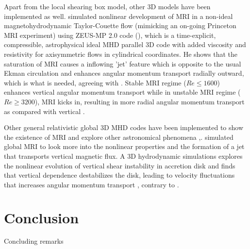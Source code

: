 \documentclass{jfm}
\begin{document}
Apart from the local shearing box model, other 3D models have been implemented
as well. \cite{Liu2008} simulated nonlinear development of MRI in a non-ideal
magnetohydrodynamic Taylor-Couette flow (mimicking an on-going Princeton MRI
experiment) using ZEUS-MP 2.0 code (\cite{Hayes2006}), which is a
time-explicit, compressible, astrophysical ideal MHD parallel 3D code with
added viscosity and resistivity for axisymmetric flows in cylindrical
coordinates. He shows that the saturation of MRI causes a inflowing 'jet'
feature which is opposite to the usual Ekman circulation and enhances angular
momentum transport radially outward, which is what is needed, agreeing with
\cite{Hawley1995}. Stable MRI regime ($ Re \le 1600$) enhances vertical angular
momentum transport while in unstable MRI regime ($Re \ge 3200$), MRI kicks in,
resulting in more radial angular momentum transport as compared with vertical
\cite{Liu2008}.

Other general relativistic global 3D MHD codes have been implemented to show
the existence of MRI and explore other astronomical phenomena
\cite{Villiers2003},\cite{Koide2000}. \cite{Kersale2006} simulated global MRI
to look more into the nonlinear properties and the formation of a jet that
transports vertical magnetic flux. A 3D hydrodynamic simulations explores the
nonlinear evolution of vertical shear instability in accretion disk and finds
that vertical dependence destabilizes the disk, leading to velocity
fluctuations that increases angular momentum transport \cite{Arlt2004},
contrary to \cite{Hawley1995}.



\section{Conclusion}
Concluding remarks





\end{document}
